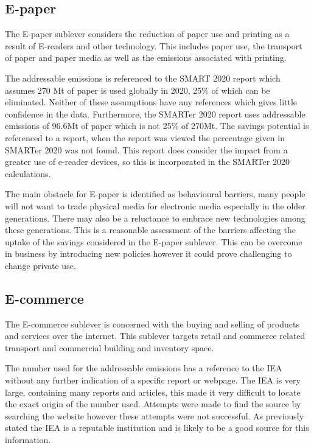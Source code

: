 
\subsection{E-paper}

The E-paper sublever considers the reduction of paper use and printing as a result of E-readers and other technology. This includes paper use, the transport of paper and paper media as well as the emissions associated with printing. 

 The addressable emissions is referenced to the SMART 2020 report which assumes 270 Mt of paper is used globally in 2020, 25\% of which can be eliminated. Neither of these assumptions have any references which gives little confidence in the data. Furthermore, the SMARTer 2020 report uses addressable emissions of 96.6Mt of paper which is not 25\% of 270Mt. The savings potential is referenced to a report, when the report was viewed the percentage given in SMARTer 2020 was not found. This report does consider the impact from a greater use of e-reader devices, so this is incorporated in the SMARTer 2020 calculations.
 
 The main obstacle for E-paper is identified as behavioural barriers, many people will not want to trade physical media for electronic media especially in the older generations. There may also be a reluctance to embrace new technologies among these generations. This is a reasonable assessment of the barriers affecting the uptake of the savings considered in the E-paper sublever. This can be overcome in business by introducing new policies however it could prove challenging to change private use.
 
 \subsection{E-commerce}

The E-commerce sublever is concerned with the buying and selling of products and services over the internet. This sublever targets retail and commerce related transport and commercial building and inventory space.  

 The number used for the addressable emissions has a reference to the IEA without any further indication of a specific report or webpage. The IEA is very large, containing many reports and articles, this made it very difficult to locate the exact origin of the number used. Attempts were made to find the source by searching the website however these attempts were not successful. As previously stated the IEA is a reputable institution and is likely to be a good source for this information. 
 
